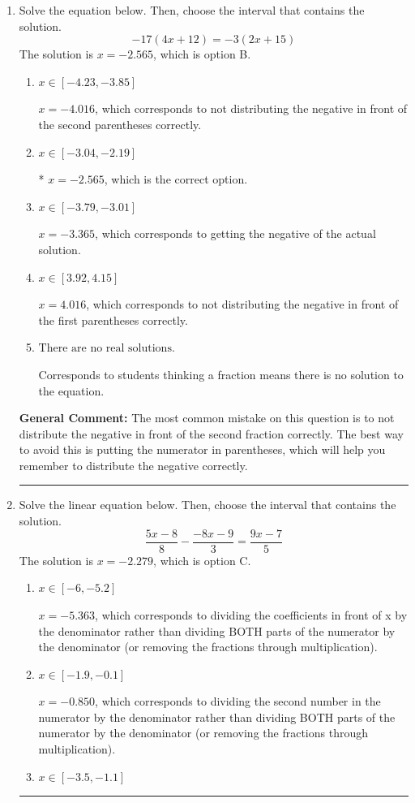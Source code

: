 \documentclass{extbook}[14pt]
\newcommand{\litem}[1]{\item #1

\rule{\textwidth}{0.4pt}}
\begin{document}
\begin{enumerate}\litem{
Solve the equation below. Then, choose the interval that contains the solution.
\[ -17(4x + 12) = -3(2x + 15) \]
The solution is \( x = -2.565 \), which is option B.\begin{enumerate}[label=\Alph*.]
\item \( x \in [-4.23, -3.85] \)

$x = -4.016$, which corresponds to not distributing the negative in front of the second parentheses correctly.
\item \( x \in [-3.04, -2.19] \)

* $x = -2.565$, which is the correct option.
\item \( x \in [-3.79, -3.01] \)

$x = -3.365$, which corresponds to getting the negative of the actual solution.
\item \( x \in [3.92, 4.15] \)

$x = 4.016$, which corresponds to not distributing the negative in front of the first parentheses correctly.
\item \( \text{There are no real solutions.} \)

Corresponds to students thinking a fraction means there is no solution to the equation.
\end{enumerate}

\textbf{General Comment:} The most common mistake on this question is to not distribute the negative in front of the second fraction correctly. The best way to avoid this is putting the numerator in parentheses, which will help you remember to distribute the negative correctly.
}
\litem{
Solve the linear equation below. Then, choose the interval that contains the solution.
\[ \frac{5x -8}{8} - \frac{-8x -9}{3} = \frac{9x -7}{5} \]
The solution is \( x = -2.279 \), which is option C.\begin{enumerate}[label=\Alph*.]
\item \( x \in [-6, -5.2] \)

 $x = -5.363$, which corresponds to dividing the coefficients in front of x by the denominator rather than dividing BOTH parts of the numerator by the denominator (or removing the fractions through multiplication).
\item \( x \in [-1.9, -0.1] \)

 $x = -0.850$, which corresponds to dividing the second number in the numerator by the denominator rather than dividing BOTH parts of the numerator by the denominator (or removing the fractions through multiplication).
\item \( x \in [-3.5, -1.1] \)


\end{enumerate}}
\end{enumerate}
\end{document}

